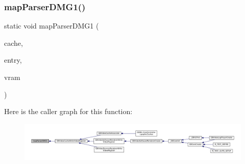 \subsubsection{\texorpdfstring{map\+Parser\+D\+M\+G1()}{mapParserDMG1()}}
{\footnotesize\ttfamily static void map\+Parser\+D\+M\+G1 (\begin{DoxyParamCaption}\item[{struct m\+Map\+Cache $\ast$}]{cache,  }\item[{struct m\+Map\+Cache\+Entry $\ast$}]{entry,  }\item[{void $\ast$}]{vram }\end{DoxyParamCaption})\hspace{0.3cm}{\ttfamily [static]}}

Here is the caller graph for this function\+:
\nopagebreak
\begin{figure}[H]
\begin{center}
\leavevmode
\includegraphics[width=350pt]{gb_2renderers_2cache-set_8c_a0a1e89b599746b796592de6e1eab8e2b_icgraph}
\end{center}
\end{figure}
